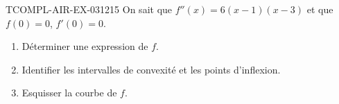\begin{exercice}{TCOMPL-AIR-EX-031}{2}{15}
On sait que $f''(x) = 6(x-1)(x-3)$ et que $f(0) = 0$, $f'(0) = 0$.
\begin{enumerate}
  \item Déterminer une expression de $f$.
  \item Identifier les intervalles de convexité et les points d'inflexion.
  \item Esquisser la courbe de $f$.
\end{enumerate}

\end{exercice}
